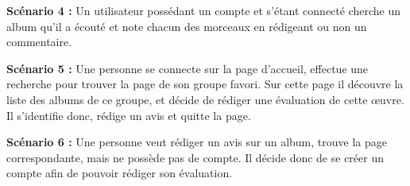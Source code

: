     \begin{paragraphe}
        \textbf{Scénario 4 :}
        Un utilisateur possédant un compte et s'étant connecté cherche un album qu'il
        a écouté et note chacun des morceaux en rédigeant ou non un commentaire.
    \end{paragraphe}

    \begin{paragraphe}
        \textbf{Scénario 5 :}
        Une personne se connecte sur la page d’accueil, effectue une recherche pour
        trouver la page de son groupe favori. Sur cette page il découvre la liste
        des albums de ce groupe, et décide de rédiger une évaluation de cette
        œuvre. Il s’identifie donc, rédige un avis et quitte la page.
    \end{paragraphe}

    \begin{paragraphe}
        \textbf{Scénario 6 :}
        Une personne veut rédiger un avis sur un album, trouve la page
        correspondante, mais ne possède pas de compte. Il décide donc de se créer un
        compte afin de pouvoir rédiger son évaluation.
    \end{paragraphe}
